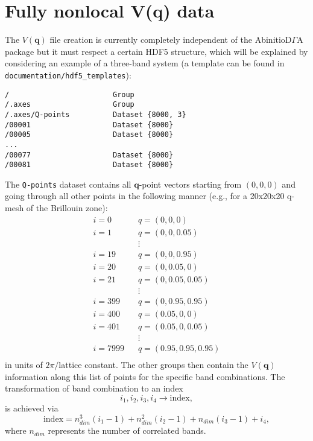 \documentclass[a4paper,11pt]{article}
\numberwithin{equation}{section} %
\begin{document}
\newpage
\section{Fully nonlocal V(q) data}
The $V(\mathbf{q})$ file creation is currently completely independent of the AbinitioD$\Gamma$A package but it must respect a certain HDF5 structure,
which will be explained by considering an example of a three-band system (a template can be found in {\color{blue}\verb+documentation/hdf5_templates+}):
\begin{lstlisting}[caption=$V(q)$ file structure, frame=single,
basicstyle=\small]
/                        Group
/.axes                   Group
/.axes/Q-points          Dataset {8000, 3}
/00001                   Dataset {8000}
/00005                   Dataset {8000}
...
/00077                   Dataset {8000}
/00081                   Dataset {8000}
\end{lstlisting}
The \verb|Q-points| dataset contains all $\mathbf{q}$-point vectors starting from $(0,0,0)$ and going through all other points in the following manner (e.g., for a 20x20x20 q-mesh of the Brillouin zone):
\begin{equation*}
\begin{aligned}
i = 0\;\;\;& q = (0,0,0)\\
i = 1\;\;\;& q = (0,0,0.05)\\
&\vdots \\
i = 19\;\;\;& q = (0,0,0.95)\\
i = 20\;\;\;& q = (0,0.05,0)\\
i = 21\;\;\;& q = (0,0.05,0.05)\\
&\vdots \\
i = 399\;\;\;& q = (0,0.95,0.95)\\
i = 400\;\;\;& q = (0.05,0,0)\\
i = 401\;\;\;& q = (0.05,0,0.05)\\
&\vdots \\
i = 7999\;\;\;& q = (0.95,0.95,0.95)\\
\end{aligned}
\end{equation*}
in units of $2\pi/$lattice constant.
The other groups then contain the $V(\mathbf{q})$ information along this list of points for the specific band combinations. The transformation of band combination to an index
\begin{equation*}
i_1,i_2,i_3,i_4 \rightarrow \mathrm{index},
\end{equation*}
is achieved via
\begin{equation*}
\mathrm{index} = n_{dim}^3(i_1-1) + n_{dim}^2(i_2-1) + n_{dim}(i_3-1) + i_4,
\end{equation*}
where $n_{dim}$ represents the number of correlated bands.
\end{document}
